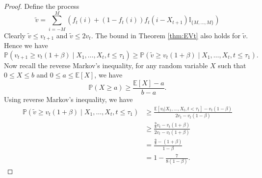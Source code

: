 \documentclass{article}
\begin{document}
\begin{proof}
    Define the process
    \begin{equation*}
            \tilde{v}=\sum_{i=-M}^M(f_t(i)+(1-f_t(i))f_t(i-X_{t+1})\mathbb{I}_{\{M,\dots,M\}})
    \end{equation*}
    Clearly $\tilde{v}\leq v_{t+1}$ and $\tilde{v}\leq 2v_t$. The bound in Theorem \ref{thm:EVt} also holds for $\tilde{v}$. Hence we have
    \begin{equation*}
        \mathbb{P}(v_{t+1}\geq v_t(1+\beta)\;|\;X_1,\dots,X_t,t\leq \tau_1)\geq \mathbb{P}(\tilde{v}\geq v_t(1+\beta)\;|\;X_1,\dots,X_t,t\leq \tau_1).
    \end{equation*}
    Now recall the reverse Markov's inequality, for any random variable $X$ such that $0\leq X\leq b$ and $0\leq a\leq\mathbb{E}[X]$, we have
    \begin{equation*}
        \mathbb{P}(X\geq a)\geq \frac{\mathbb{E}[X]-a}{b-a}.
    \end{equation*}
    Using reverse Markov's inequality, we have
    \begin{align*}
        \mathbb{P}(\tilde{v}\geq v_t(1+\beta)\;|\;X_1,\dots,X_t,t\leq \tau_1) &\geq \frac{\mathbb{E}[v_t|X_1,\dots,X_t,t<\tau_1]-v_t(1-\beta)}{2v_t-v_t(1-\beta)}\\
        & \geq \frac{\frac{9}{8}v_t-v_t(1+\beta)}{2v_t-v_t(1+\beta)}\\
        &=\frac{\frac{9}{8}-(1+\beta)}{1-\beta}\\
        &=1-\frac{7}{8(1-\beta)}.
    \end{align*}
\end{proof}
\end{document}
